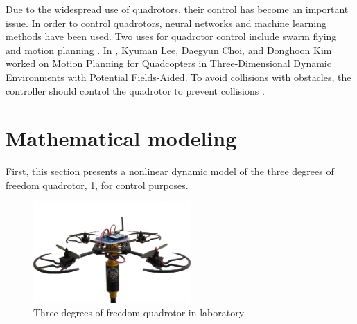\documentclass[conference]{IEEEtran}
\begin{document}
Due to the widespread use of quadrotors, their control has become an important issue.
In order to control quadrotors, neural networks \cite{b9} and machine learning \cite{b10} methods have been used.
Two uses for quadrotor control include swarm flying \cite{b12} and motion planning \cite{b11}.
In \cite{b13}, Kyuman Lee, Daegyun Choi, and Donghoon Kim worked on  Motion Planning for Quadcopters in Three-Dimensional Dynamic Environments with Potential Fields-Aided.
To avoid collisions with obstacles, the controller should control the quadrotor to prevent collisions \cite{b14}.







\section{Mathematical modeling}
First, this section presents a nonlinear dynamic model of the three degrees of freedom quadrotor, \figurename{\ref{quadlab}}, for control purposes.
\begin{figure}[!htbp]
	\includegraphics[width=6cm]{../Figures/introduction/3DOFQuad.png}
	\centering
	\caption{Three degrees of freedom quadrotor in laboratory}
	\label{quadlab}
\end{figure}
\end{document}
